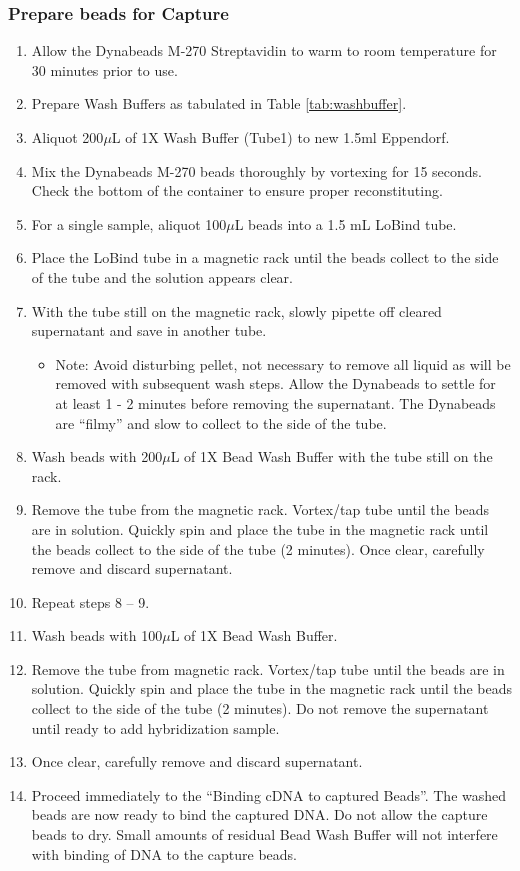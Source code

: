 \subsubsection{Prepare beads for Capture}
\begin{enumerate}
	\item Allow the Dynabeads M-270 Streptavidin to warm to room temperature for 30 minutes prior to use.
	\item Prepare Wash Buffers as tabulated in Table \cref{tab:washbuffer}.	
	\item Aliquot 200$\mu$L of 1X Wash Buffer (Tube1) to new 1.5ml Eppendorf. 
	\item Mix the Dynabeads M-270 beads thoroughly by vortexing for 15 seconds. Check the bottom of the container to ensure proper reconstituting. 
	\item For a single sample, aliquot 100$\mu$L beads into a 1.5 mL LoBind tube.
	\item Place the LoBind tube in a magnetic rack until the beads collect to the side of the tube and the solution appears clear. 
	\item With the tube still on the magnetic rack, slowly pipette off cleared supernatant and save in another tube. 
	\begin{itemize}
		\item Note: Avoid disturbing pellet, not necessary to remove all liquid as will be removed with subsequent wash steps. Allow the Dynabeads to settle for at least 1 - 2 minutes before removing the supernatant. The Dynabeads are “filmy” and slow to collect to the side of the tube.
	\end{itemize}
	\item Wash beads with 200$\mu$L of 1X Bead Wash Buffer with the tube still on the rack.
	\item Remove the tube from the magnetic rack. Vortex/tap tube until the beads are in solution. Quickly spin and place the tube in the magnetic rack until the beads collect to the side of the tube (2 minutes). Once clear, carefully remove and discard supernatant.
	\item Repeat steps 8 – 9.
	\item Wash beads with 100$\mu$L of 1X Bead Wash Buffer.
	\item Remove the tube from magnetic rack. Vortex/tap tube until the beads are in solution. Quickly spin and place the tube in the magnetic rack until the beads collect to the side of the tube (2 minutes). 
	Do not remove the supernatant until ready to add hybridization sample.
	\item Once clear, carefully remove and discard supernatant.
	\item Proceed immediately to the “Binding cDNA to captured Beads”. The washed beads are now ready to bind the captured DNA. Do not allow the capture beads to dry. Small amounts of residual Bead Wash Buffer will not interfere with binding of DNA to the capture beads.
\end{enumerate} 

